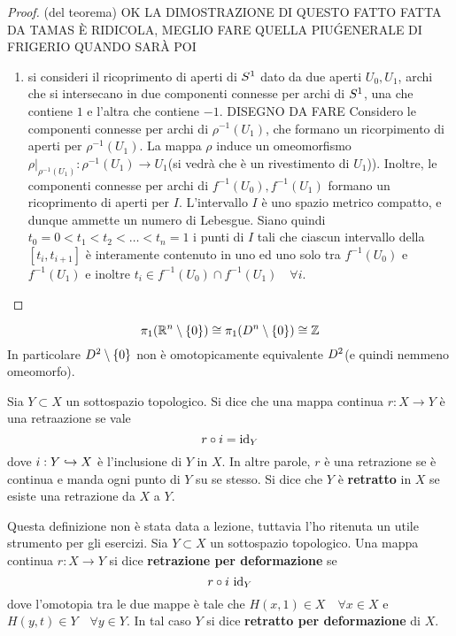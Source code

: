 \documentclass[]{article}
\begin{document}
\begin{proof} (del teorema) \nl
    OK LA DIMOSTRAZIONE DI QUESTO FATTO FATTA DA TAMAS \`E RIDICOLA, MEGLIO FARE QUELLA PIU\' GENERALE DI FRIGERIO QUANDO SAR\`A POI
    \begin{enumerate}
        \item si consideri il ricoprimento di aperti di $S^{1}$ dato da due aperti $U_0, U_1$, archi che si intersecano in due componenti 
        connesse per archi di $S^{1}$, una che contiene $1$ e l'altra che contiene $-1$. 
        \nl
        DISEGNO DA FARE
        \nl
        Considero le componenti connesse per archi di $\rho^{-1}(U_1)$, che formano un ricorpimento di aperti
        per $\rho^{-1}(U_1)$. La mappa $\rho$ induce un omeomorfismo 
        $\rho\big|_{\rho^{-1}(U_1)}: \rho^{-1}(U_1) \to U_1$(si vedr\`a che \`e un rivestimento di $U_1$)).
        \nl
        Inoltre, le componenti connesse per archi di $f^{-1}(U_0), f^{-1}(U_1)$ formano un ricoprimento di aperti per $I$.
        \nl
        L'intervallo $I$ \`e uno spazio metrico compatto, e dunque ammette un numero di Lebesgue. \nl
        Siano quindi $t_0 = 0 < t_1 < t_2 < \ldots < t_n = 1$ i punti di $I$ tali che
        ciascun intervallo della $\left[t_i, t_{i+1}\right]$ \`e interamente contenuto in uno
        ed uno solo tra  $f^{-1}(U_0)$ e $f^{-1}(U_1)$ e inoltre $t_i \in f^{-1}(U_0) \cap f^{-1}(U_1) \quad \forall i$.
        \nl
    \end{enumerate}
\end{proof}

\begin{corollary} \nl
    \[  
        \pi_1(\mathbb{R}^n \setminus \left\{ 0 \right\}) \cong \pi_1(D^n \setminus \left\{ 0 \right\}) \cong \mathbb{Z}
    \]
    In particolare $D^{2} \setminus \left\{ 0 \right\}$ non \`e omotopicamente equivalente $D^{2}$(e quindi nemmeno omeomorfo).
\end{corollary}

\begin{definition} [Retrazione] \nl
    Sia $Y \subset X$ un sottospazio topologico. Si dice che una mappa continua $r: X \to Y$ \`e una retraazione se vale
    \[
        r \circ i = \mathrm{id}_Y
    \]
    dove $i: Y \hookrightarrow X$ \`e l'inclusione di $Y$ in $X$. \nl 
    In altre parole, $r$ \`e una retrazione se \`e continua e manda ogni punto di $Y$ su se stesso. \nl
    Si dice che $Y$ \`e \textbf{retratto} in $X$ se esiste una retrazione da $X$ a $Y$.
\end{definition}


\begin{definition}  \nl
    Questa definizione non \`e stata data a lezione, tuttavia l'ho ritenuta un utile strumento per gli esercizi. \nl
    Sia $Y \subset X$ un sottospazio topologico. Una mappa continua $r: X \to Y$ si dice \textbf{retrazione per deformazione} se
    \[
        r \circ i ~ \mathrm{id}_Y
    \]
    dove l'omotopia tra le due mappe  \`e tale che $H(x, 1) \in X \quad \forall x \in X$ e $H(y,t) \in Y \quad \forall y \in Y$. \nl
    In tal caso $Y$ si dice \textbf{retratto per deformazione} di $X$.
\end{definition}
\end{document}
